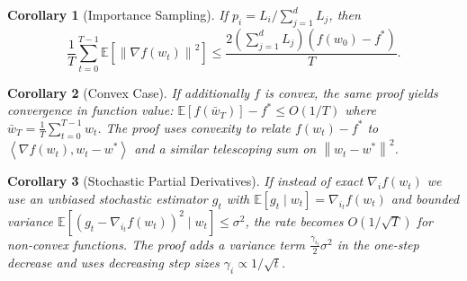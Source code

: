 \documentclass{article}
\newtheorem{corollary}{Corollary}
\newcommand{\E}{\mathbb{E}}
\newcommand{\norm}[1]{\left\|#1\right\|}
\newcommand{\inner}[2]{\left\langle #1, #2 \right\rangle}
\begin{document}
\begin{corollary}[Importance Sampling]
If $p_i = L_i / \sum_{j=1}^d L_j$, then
\begin{equation}
\frac{1}{T} \sum_{t=0}^{T-1} \E\left[ \norm{\nabla f(w_t)}^2 \right]
\le \frac{2 \left( \sum_{j=1}^d L_j \right) (f(w_0)-f^*)}{T}.
\end{equation}
\end{corollary}

\begin{corollary}[Convex Case]
If additionally $f$ is convex, the same proof yields convergence in function value: $\E[f(\bar{w}_T)] - f^* \le O(1/T)$ where $\bar{w}_T = \frac{1}{T}\sum_{t=0}^{T-1} w_t$. The proof uses convexity to relate $f(w_t)-f^*$ to $\inner{\nabla f(w_t)}{w_t - w^*}$ and a similar telescoping sum on $\norm{w_t - w^*}^2$.
\end{corollary}

\begin{corollary}[Stochastic Partial Derivatives]
If instead of exact $\nabla_i f(w_t)$ we use an unbiased stochastic estimator $g_t$ with $\E[g_t \mid w_t] = \nabla_{i_t} f(w_t)$ and bounded variance $\E[(g_t - \nabla_{i_t} f(w_t))^2 \mid w_t] \le \sigma^2$, the rate becomes $O(1/\sqrt{T})$ for non-convex functions. The proof adds a variance term $\frac{\gamma_{i_t}}{2}\sigma^2$ in the one-step decrease and uses decreasing step sizes $\gamma_i \propto 1/\sqrt{t}$.
\end{corollary}
\end{document}
